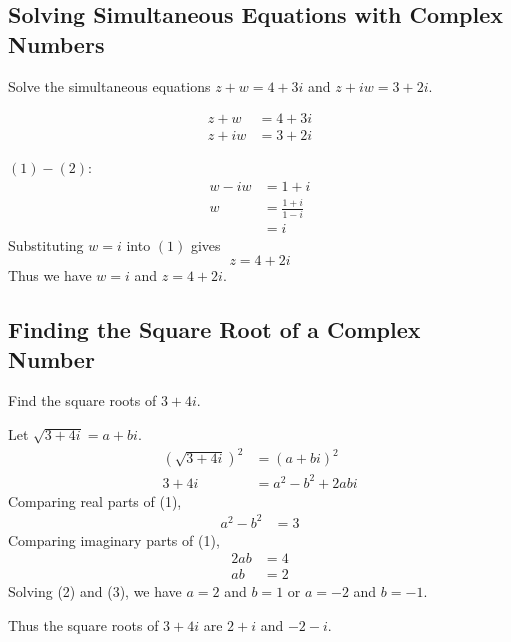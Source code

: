 \documentclass[11pt,a4paper]{book}
\begin{document}
\subsection{Solving Simultaneous Equations with Complex Numbers }

\begin{example}

Solve the simultaneous equations $z+w=4+3i$ and $z+iw=3+2i$.

\Solution

\begin{align*}
z+w & =4+3i\tag{1}\\
z+iw & =3+2i\tag{2}
\end{align*}

$\left(1\right)-\left(2\right)$:
\begin{align*}
w-iw & =1+i\\
w & =\frac{1+i}{1-i}\\
 & =i
\end{align*}
Substituting $w=i$ into $\left(1\right)$ gives
\[
z=4+2i
\]
Thus we have $w=i$ and $z=4+2i$.

\end{example}

\newpage

\subsection{Finding the Square Root of a Complex Number}

\begin{example}

Find the square roots of $3+4i$.

\Solution

Let $\sqrt{3+4i}=a+bi$.
\begin{align*}
\left(\sqrt{3+4i}\right)^{2} & =\left(a+bi\right)^{2}\\
3+4i & =a^{2}-b^{2}+2abi\tag{1}
\end{align*}
Comparing real parts of (1),
\begin{align*}
a^{2}-b^{2} & =3\tag{2}
\end{align*}
Comparing imaginary parts of (1),
\begin{align*}
2ab & =4\\
ab & =2\tag{3}
\end{align*}
Solving (2) and (3), we have $a=2$ and $b=1$ or $a=-2$ and $b=-1$.

Thus the square roots of $3+4i$ are $2+i$ and $-2-i$.

\end{example}
\end{document}
